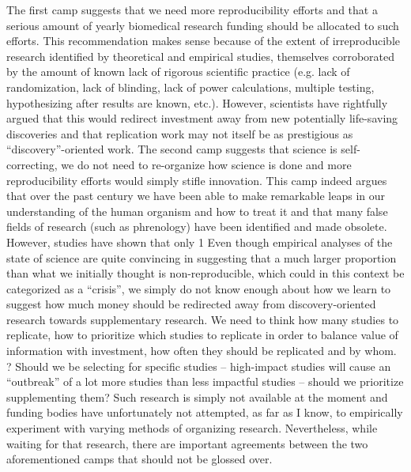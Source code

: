 \documentclass[12pt]{article}
\begin{document}
The first camp suggests that we need more reproducibility efforts and that a serious amount of yearly biomedical research funding should be allocated to such efforts. This recommendation makes sense because of the extent of irreproducible research identified by theoretical and empirical studies, themselves corroborated by the amount of known lack of rigorous scientific practice (e.g. lack of randomization, lack of blinding, lack of power calculations, multiple testing, hypothesizing after results are known, etc.). However, scientists have rightfully argued that this would redirect investment away from new potentially life-saving discoveries and that replication work may not itself be as prestigious as “discovery”-oriented work. 
The second camp suggests that science is self-correcting, we do not need to re-organize how science is done and more reproducibility efforts would simply stifle innovation. This camp indeed argues that over the past century we have been able to make remarkable leaps in our understanding of the human organism and how to treat it and that many false fields of research (such as phrenology) have been identified and made obsolete. However, studies have shown that only 1%
Even though empirical analyses of the state of science are quite convincing in suggesting that a much larger proportion than what we initially thought is non-reproducible, which could in this context be categorized as a “crisis”, we simply do not know enough about how we learn to suggest how much money should be redirected away from discovery-oriented research towards supplementary research. We need to think how many studies to replicate, how to prioritize which studies to replicate in order to balance value of information with investment, how often they should be replicated and by whom. ? Should we be selecting for specific studies – high-impact studies will cause an “outbreak” of a lot more studies than less impactful studies – should we prioritize supplementing them? Such research is simply not available at the moment and funding bodies have unfortunately not attempted, as far as I know, to empirically experiment with varying methods of organizing research. Nevertheless, while waiting for that research, there are important agreements between the two aforementioned camps that should not be glossed over.
\end{document}
